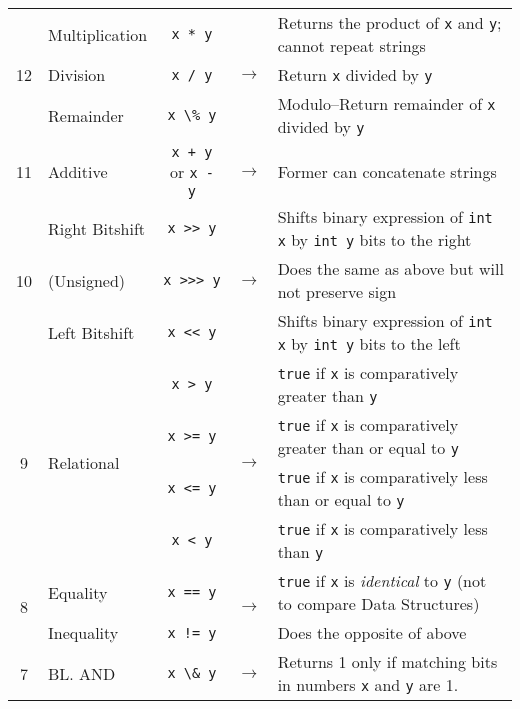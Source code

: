 \documentclass{article}
\begin{document}
\begin{center}
\begin{tabularx}{\textwidth}{clccX}
 \multirow{3}{*}{12}  & Multiplication    & \lstinline|x * y| & \multirow{3}{*}{\(\to\)} & Returns the product of \lstinline|x| and \lstinline|y|; cannot repeat strings\\
                      & Division          & \lstinline|x / y| & & Return \lstinline|x| divided by \lstinline|y|\\
                      & Remainder         & \lstinline|x \% y| & & Modulo--Return remainder of \lstinline|x| divided by \lstinline|y|\\\midrule
                  11  & Additive          & \lstinline|x + y| or \lstinline|x - y| & \(\to\) & Former can concatenate strings\\\midrule
  \multirow{3}{*}{10} & Right Bitshift & \lstinline|x >> y| & \multirow{3}{*}{\(\to\)} & Shifts binary expression of \lstinline|int x| by \lstinline|int y| bits to the right\\
                      & (Unsigned) & \lstinline|x >>> y| & & Does the same as above but will not preserve sign\\
                      & Left Bitshift & \lstinline|x << y| & & Shifts binary expression of \lstinline|int x| by \lstinline|int y| bits to the left\\\midrule
  \multirow{4}{*}{9}   & \multirow{4}{*}{Relational}        & \lstinline|x > y| & \multirow{4}{*}{\(\to\)} & \lstinline|true| if \lstinline|x| is comparatively greater than \lstinline|y| \\
                      &                   & \lstinline|x >= y| & & \lstinline|true| if \lstinline|x| is comparatively greater than or equal to \lstinline|y| \\
                      &                   & \lstinline|x <= y| & & \lstinline|true| if \lstinline|x| is comparatively less than or equal to \lstinline|y| \\
                      &                   & \lstinline|x < y| & & \lstinline|true| if \lstinline|x| is comparatively less than \lstinline|y| \\\midrule
  \multirow{2}{*}{8}  & Equality          & \lstinline|x == y|    & \multirow{2}{*}{\(\to\)} & \lstinline|true| if \lstinline|x| is \textit{identical} to \lstinline|y| (not to compare Data Structures)\\
                      & Inequality        & \lstinline|x != y|    &  & Does the opposite of above\\\midrule
                  7   & BL. AND           & \lstinline|x \& y|    & \(\to\) & Returns 1 only if matching bits in numbers \lstinline|x| and \lstinline|y| are 1. \\\midrule

\end{tabularx}
\end{center}
\end{document}
